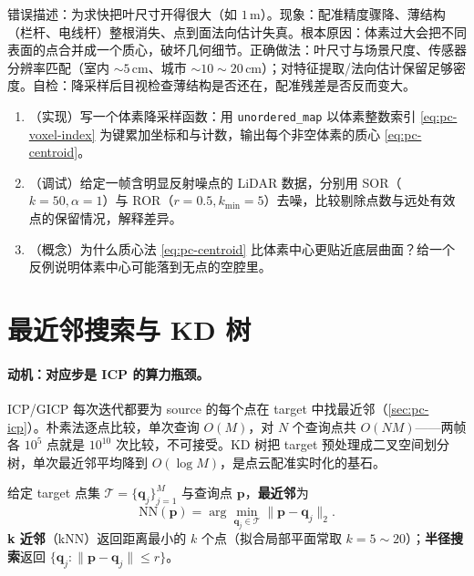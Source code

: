 \begin{pitfall}
错误描述：为求快把叶尺寸开得很大（如 $1\,\mathrm{m}$）。现象：配准精度骤降、薄结构（栏杆、电线杆）整根消失、点到面法向估计失真。根本原因：体素过大会把不同表面的点合并成一个质心，破坏几何细节。正确做法：叶尺寸与场景尺度、传感器分辨率匹配（室内 $\sim5\,\mathrm{cm}$、城市 $\sim10\sim20\,\mathrm{cm}$）；对特征提取/法向估计保留足够密度。自检：降采样后目视检查薄结构是否还在，配准残差是否反而变大。
\end{pitfall}

\begin{practice}
\begin{enumerate}
  \item （实现）写一个体素降采样函数：用 \texttt{unordered\_map} 以体素整数索引 \cref{eq:pc-voxel-index} 为键累加坐标和与计数，输出每个非空体素的质心 \cref{eq:pc-centroid}。
  \item （调试）给定一帧含明显反射噪点的 LiDAR 数据，分别用 SOR（$k=50,\alpha=1$）与 ROR（$r=0.5,k_{\min}=5$）去噪，比较剔除点数与远处有效点的保留情况，解释差异。
  \item （概念）为什么质心法 \cref{eq:pc-centroid} 比体素中心更贴近底层曲面？给一个反例说明体素中心可能落到无点的空腔里。
\end{enumerate}
\end{practice}

\section{最近邻搜索与 KD 树}
\label{sec:pc-kdtree}

\paragraph{动机：对应步是 ICP 的算力瓶颈。}
ICP/GICP 每次迭代都要为 source 的每个点在 target 中找最近邻（\cref{sec:pc-icp}）。朴素法逐点比较，单次查询 $O(M)$，对 $N$ 个查询点共 $O(NM)$——两帧各 $10^5$ 点就是 $10^{10}$ 次比较，不可接受。KD 树把 target 预处理成二叉空间划分树，单次最近邻平均降到 $O(\log M)$，是点云配准实时化的基石\cite{segal2009gicp}。

\begin{definition}\label{def:pc-nn}
给定 target 点集 $\mathcal{T}=\{\mathbf{q}_j\}_{j=1}^{M}$ 与查询点 $\mathbf{p}$，\textbf{最近邻}为
\begin{equation}
  \mathrm{NN}(\mathbf{p})=\arg\min_{\mathbf{q}_j\in\mathcal{T}}\|\mathbf{p}-\mathbf{q}_j\|_2.
  \label{eq:pc-nn}
\end{equation}
\textbf{k 近邻}（kNN）返回距离最小的 $k$ 个点（拟合局部平面常取 $k=5\sim20$）；\textbf{半径搜索}返回 $\{\mathbf{q}_j:\|\mathbf{p}-\mathbf{q}_j\|\le r\}$。
\end{definition}

